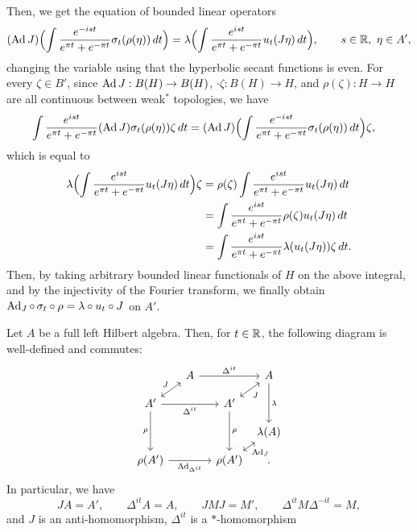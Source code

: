 \documentclass{../../small}
\begin{document}
\begin{pf}
Then, we get the equation of bounded linear operators
\[(\operatorname{Ad} J)\Bigl(\int\frac{e^{-ist}}{e^{\pi t}+e^{-\pi t}}\sigma_t(\rho(\eta))\,dt\Bigr)
=\lambda\Bigl(\int\frac{e^{ist}}{e^{\pi t}+e^{-\pi t}}u_t(J\eta)\,dt\Bigr),\qquad s\in\mathbb{R},\ \eta\in A',\]
changing the variable using that the hyperbolic secant functions is even.
For every $\zeta\in B'$, since $\operatorname{Ad} J:B(H)\to B(H)$, $\cdot\zeta:B(H)\to H$, and $\rho(\zeta):H\to H$ are all continuous between weak$^*$ topologies, we have
\begin{align*}
\int\frac{e^{ist}}{e^{\pi t}+e^{-\pi t}}(\operatorname{Ad} J)\sigma_t(\rho(\eta))\zeta\,dt
&=(\operatorname{Ad} J)\Bigl(\int\frac{e^{-ist}}{e^{\pi t}+e^{-\pi t}}\sigma_t(\rho(\eta))\,dt\Bigr)\zeta,
\end{align*}
which is equal to
\begin{align*}
\lambda\Bigl(\int\frac{e^{ist}}{e^{\pi t}+e^{-\pi t}}u_t(J\eta)\,dt\Bigr)\zeta
&=\rho(\zeta)\int\frac{e^{ist}}{e^{\pi t}+e^{-\pi t}}u_t(J\eta)\,dt\\
&=\int\frac{e^{ist}}{e^{\pi t}+e^{-\pi t}}\rho(\zeta)u_t(J\eta)\,dt\\
&=\int\frac{e^{ist}}{e^{\pi t}+e^{-\pi t}}\lambda(u_t(J\eta))\zeta\,dt.
\end{align*}
Then, by taking arbitrary bounded linear functionals of $H$ on the above integral, and by the injectivity of the Fourier transform, we finally obtain $\operatorname{Ad}_J\circ\,\sigma_t\circ\rho=\lambda\circ u_t\circ J$ on $A'$.
\end{pf}

\begin{cor}
Let $A$ be a full left Hilbert algebra.
Then, for $t\in\mathbb{R}$, the following diagram is well-defined and commutes:
\[\begin{tikzcd}[column sep={3.5em,between origins},row sep={2.5em,between origins}]
&A\ar{rr}{\Delta^{it}}&&A\ar{dd}{\lambda}\\
A'\ar[<->]{ur}{J}\ar[swap]{rr}{\Delta^{it}}\ar[swap]{dd}{\rho}&&A'\ar[<->,swap]{ur}{J}\ar{dd}{\rho}&\\
&&&\lambda(A)\\
\rho(A')\ar[swap]{rr}{\Ad_{\Delta^{it}}}&&\rho(A')\ar[<->,swap]{ur}{\Ad_J}&.
\end{tikzcd}\]
In particular, we have
\[JA=A',\qquad\Delta^{it}A=A,\qquad JMJ=M',\qquad\Delta^{it}M\Delta^{-it}=M,\]
and $J$ is an anti-homomorphism, $\Delta^{it}$ is a $*$-homomorphism
\end{cor}
\begin{pf}

\end{pf}
\end{document}
